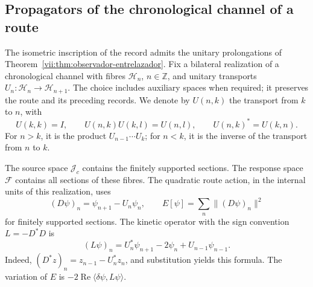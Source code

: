 \subsection{Propagators of the chronological channel of a route}
\label{vii:subsec:green-cronologico}

The isometric inscription of the record admits the unitary prolongations
of Theorem~\ref{vii:thm:observador-entrelazador}. Fix a bilateral realization
of a chronological channel with fibres \(\mathcal H_n\),
\(n\in\mathbb Z\), and unitary transports
\(U_n:\mathcal H_n\to\mathcal H_{n+1}\).
The choice includes auxiliary spaces when required; it preserves
the route and its preceding records. We denote by \(U(n,k)\) the transport
from \(k\) to \(n\), with
\[
 U(k,k)=I,\qquad U(n,k)U(k,l)=U(n,l),\qquad
 U(n,k)^*=U(k,n).
\]
For \(n>k\), it is the product \(U_{n-1}\cdots U_k\); for \(n<k\),
it is the inverse of the transport from \(n\) to \(k\).

The source space \(\mathcal J_c\) contains the finitely supported sections.
The response space \(\mathcal F\) contains all sections of these fibres.
The quadratic route action, in the internal units of this realization, uses
\[
 (D\psi)_n=\psi_{n+1}-U_n\psi_n,\qquad
 E[\psi]=\sum_n\|(D\psi)_n\|^2
\]
for finitely supported sections. The kinetic operator with the sign convention
\(L=-D^*D\) is
\begin{equation}
 (L\psi)_n=U_n^*\psi_{n+1}-2\psi_n+U_{n-1}\psi_{n-1}.
 \label{vii:eq:diferencia-covariante-bidireccional}
\end{equation}
Indeed, \((D^*z)_n=z_{n-1}-U_n^*z_n\), and substitution yields
this formula. The variation of \(E\) is
\(-2\operatorname{Re}\langle\delta\psi,L\psi\rangle\).


